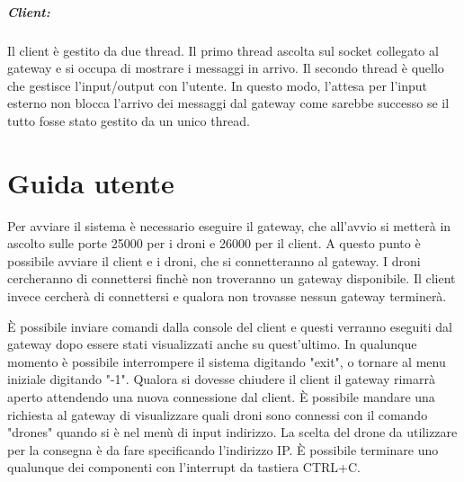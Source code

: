 \documentclass[a4paper,12pt]{report}
\begin{document}
\paragraph*{Client:} Il client è gestito da due thread. Il primo thread ascolta sul socket collegato al gateway e si occupa di mostrare i messaggi in arrivo. 
Il secondo thread è quello che gestisce l'input/output con l'utente. In questo modo, l'attesa per l'input esterno non blocca l'arrivo dei messaggi dal gateway 
come sarebbe successo se il tutto fosse stato gestito da un unico thread.

\appendix
\chapter{Guida utente}

Per avviare il sistema è necessario eseguire il gateway, che all'avvio si metterà in ascolto sulle porte 25000 per i droni e 26000 per il client.
A questo punto è possibile avviare il client e i droni, che si connetteranno al gateway. I droni cercheranno di connettersi finchè non troveranno un gateway
disponibile. Il client invece cercherà di connettersi e qualora non trovasse nessun gateway terminerà.

È possibile inviare comandi dalla console del client e questi verranno eseguiti dal gateway dopo essere stati visualizzati anche su quest'ultimo. In qualunque momento è possibile
interrompere il sistema digitando "exit", o tornare al menu iniziale digitando "-1".
Qualora si dovesse chiudere il client il gateway rimarrà aperto attendendo una nuova connessione dal client.
È possibile mandare una richiesta al gateway di visualizzare quali droni sono connessi con il comando "drones" quando si è nel menù di input indirizzo. La scelta del drone da 
utilizzare per la consegna è da fare specificando l'indirizzo IP.
È possibile terminare uno qualunque dei componenti con l'interrupt da tastiera CTRL+C.
\end{document}
